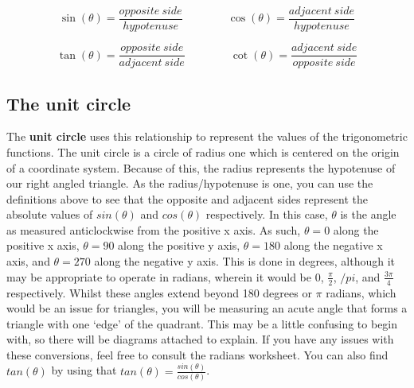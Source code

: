 \documentclass[
  12pt,
  a4paper, oneside]{starmastarticle}
\begin{document}
\begin{tcolorbox}[enhanced jigsaw, colback=white, opacityback=0, title=\textcolor{quarto-callout-note-color}{\faInfo}\hspace{0.5em}{Trigonometric functions}, toptitle=1mm, colbacktitle=quarto-callout-note-color!10!white, bottomrule=.15mm, left=2mm, rightrule=.15mm, breakable, colframe=quarto-callout-note-color-frame, bottomtitle=1mm, opacitybacktitle=0.6, toprule=.15mm, titlerule=0mm, arc=.35mm, coltitle=black, leftrule=.75mm]
\[\sin(\theta) = \frac{opposite\ side}{hypotenuse} \qquad\qquad \cos(\theta) = \frac{adjacent\ side}{hypotenuse}\]

\[\tan(\theta) = \frac{opposite\ side}{adjacent\ side} \qquad\qquad \cot(\theta) = \frac{adjacent\ side}{opposite\ side} \]
\end{tcolorbox}

\hypertarget{the-unit-circle}{%
\subsection*{The unit circle}\label{the-unit-circle}}

The \textbf{unit circle} uses this relationship to represent the values
of the trigonometric functions. The unit circle is a circle of radius
one which is centered on the origin of a coordinate system. Because of
this, the radius represents the hypotenuse of our right angled triangle.
As the radius/hypotenuse is one, you can use the definitions above to
see that the opposite and adjacent sides represent the absolute values
of \(sin(\theta)\) and \(cos(\theta)\) respectively. In this case,
\(\theta\) is the angle as measured anticlockwise from the positive x
axis. As such, \(\theta=0\) along the positive x axis, \(\theta=90\)
along the positive y axis, \(\theta=180\) along the negative x axis, and
\(\theta=270\) along the negative y axis. This is done in degrees,
although it may be appropriate to operate in radians, wherein it would
be 0, \(\frac{\pi}{2}\), \(/pi\), and \(\frac{3\pi}{4}\) respectively.
Whilst these angles extend beyond 180 degrees or \(\pi\) radians, which
would be an issue for triangles, you will be measuring an acute angle
that forms a triangle with one `edge' of the quadrant. This may be a
little confusing to begin with, so there will be diagrams attached to
explain. If you have any issues with these conversions, feel free to
consult the radians worksheet. You can also find \(tan(\theta)\) by
using that \(tan(\theta)=\frac{sin(\theta)}{cos(\theta)}\).
\end{document}
